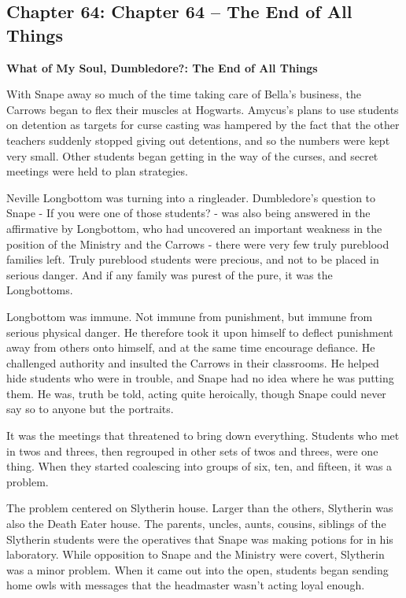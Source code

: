 \documentclass[a4paper,11pt]{article}
\begin{document}
\subsection{Chapter 64: Chapter 64 – The End of All Things}

\textbf{What of My Soul, Dumbledore?: The End of All Things}

With Snape away so much of the time taking care of Bella's business, the Carrows began to flex their muscles at Hogwarts. Amycus's plans to use students on detention as targets for curse casting was hampered by the fact that the other teachers suddenly stopped giving out detentions, and so the numbers were kept very small. Other students began getting in the way of the curses, and secret meetings were held to plan strategies.

Neville Longbottom was turning into a ringleader. Dumbledore's question to Snape - If you were one of those students? - was also being answered in the affirmative by Longbottom, who had uncovered an important weakness in the position of the Ministry and the Carrows - there were very few truly pureblood families left. Truly pureblood students were precious, and not to be placed in serious danger. And if any family was purest of the pure, it was the Longbottoms.

Longbottom was immune. Not immune from punishment, but immune from serious physical danger. He therefore took it upon himself to deflect punishment away from others onto himself, and at the same time encourage defiance. He challenged authority and insulted the Carrows in their classrooms. He helped hide students who were in trouble, and Snape had no idea where he was putting them. He was, truth be told, acting quite heroically, though Snape could never say so to anyone but the portraits.

It was the meetings that threatened to bring down everything. Students who met in twos and threes, then regrouped in other sets of twos and threes, were one thing. When they started coalescing into groups of six, ten, and fifteen, it was a problem.

The problem centered on Slytherin house. Larger than the others, Slytherin was also the Death Eater house. The parents, uncles, aunts, cousins, siblings of the Slytherin students were the operatives that Snape was making potions for in his laboratory. While opposition to Snape and the Ministry were covert, Slytherin was a minor problem. When it came out into the open, students began sending home owls with messages that the headmaster wasn't acting loyal enough.
\end{document}
